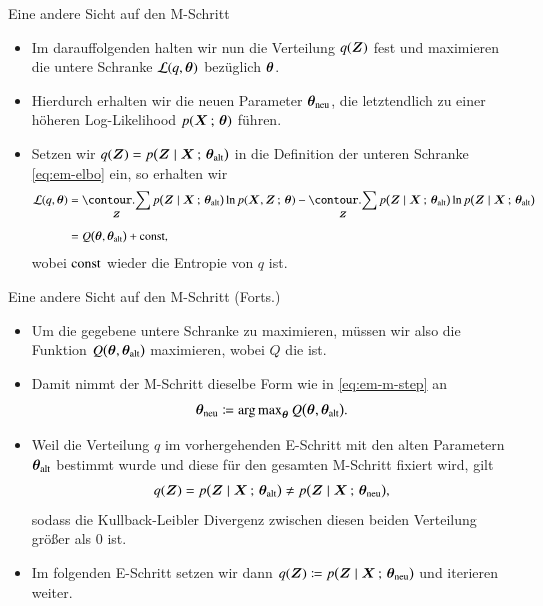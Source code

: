 \begin{frame}{Eine andere Sicht auf den M-Schritt}{}
	\begin{itemize}
		\item Im darauffolgenden  halten wir nun die Verteilung $q(\bm{Z})$ fest und maximieren die untere Schranke $\mathcal{L}(q, \bm{\theta})$
			bezüglich $\bm{\theta}$.
		\item Hierdurch erhalten wir die neuen Parameter $\bm{\theta}_{\text{neu}}$, die letztendlich zu einer höheren
			Log-Likelihood $p(\bm{X} \,;\, \bm{\theta})$ führen.
		\item Setzen wir $q(\bm{Z}) = p\bigl( \bm{Z} \mid \bm{X} \,;\, \bm{\theta}_{\text{alt}} \bigr)$ in die Definition der unteren Schranke \eqref{eq:em-elbo} ein,
			so erhalten wir
		\begin{align*}
			\sL(q, \btheta)
				&= \sum_{\bZ} p\bigl( \bZ \mid \bX \param \bthetaOld \bigr) \ln p(\bX, \bZ \param \btheta)
					- \sum_{\bZ} p\bigl( \bZ \mid \bX \param \bthetaOld \bigr) \ln p\bigl( \bZ \mid \bX \param \bthetaOld \bigr)
		\\[2mm]
				&= Q\bigl( \btheta, \bthetaOld \bigr) + \const,
		\end{align*}
		wobei $\text{const}$ wieder die Entropie von $q$ ist.
	\end{itemize}
\end{frame}


\begin{frame}{Eine andere Sicht auf den M-Schritt (Forts.)}{}
	\begin{itemize}
		\item Um die gegebene untere Schranke zu maximieren, müssen wir also die Funktion $Q\bigl( \bm{\theta}, \bm{\theta}_{\text{alt}} \bigr)$ maximieren,
			wobei $Q$ die  ist.
		\item Damit nimmt der M-Schritt dieselbe Form wie in \eqref{eq:em-m-step} an
		\begin{equation*}
			\bm{\theta}_{\text{neu}} \coloneqq \operatorname{arg\,max}_{\bm{\theta}} Q\bigl( \bm{\theta}, \bm{\theta}_{\text{alt}} \bigr).
		\end{equation*}
		\item Weil die Verteilung $q$ im vorhergehenden E-Schritt mit den alten Parametern $\bm{\theta}_{\text{alt}}$ bestimmt wurde und diese
			für den gesamten M-Schritt fixiert wird, gilt
		\begin{equation*}
			q(\bm{Z}) = p\bigl( \bm{Z} \mid \bm{X} \,;\, \bm{\theta}_{\text{alt}} \bigr) \ne p\bigl( \bm{Z} \mid \bm{X} \,;\, \bm{\theta}_{\text{neu}} \bigr),
		\end{equation*}
			sodass die Kullback-Leibler Divergenz zwischen diesen beiden Verteilung größer als 0 ist.
		\item Im folgenden E-Schritt setzen wir dann $q(\bm{Z}) \coloneqq p\bigl( \bm{Z} \mid \bm{X} \,;\, \bm{\theta}_{\text{neu}} \bigr)$ und iterieren weiter.
	\end{itemize}
\end{frame}


